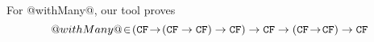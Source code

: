 For @withMany@, our tool proves
$$
@withMany@\! \in \! ({\tt CF}\! \rightarrow\! ({\tt CF} \rightarrow {\tt CF}) \rightarrow {\tt CF}) \rightarrow {\tt CF} \rightarrow ({\tt CF} \! \rightarrow \! {\tt CF}) \rightarrow {\tt CF}
$$

\begin{comment}
\subsection{A small case-study about invariants}

We consider a somewhat non-standard way of expressing propositional
logic formulae:

\begin{code}
data Formula = And [Formula]
             | Or  [Formula]
             | Neg (Formula)
             | Implies (Formula) (Formula)
             | Lit Bool
\end{code}

One invariant that we are particularily interested in is that we
should never have two consecutive negations, and that the lists of
@And@ and @Or@ are of length $\ge$ 2. We can express that as an ordinary
Haskell predicate:

\begin{code}
invariant :: Formula -> Bool
invariant f = case f of
  And xs      -> properList xs && all invariant xs
  Or xs       -> properList xs && all invariant xs
  Neg Neg{}   -> False
  Neg x       -> invariant x
  Implies x y -> invariant x && invariant y
  Lit x       -> True

properList :: [a] -> Bool
properList []  = False
properList [_] = False
properList _   = True
\end{code}

Now, we have a recursive function that negates formula:

\begin{code}
neg :: Formula -> Formula
neg (Neg f)         = f
neg (And fs)        = Or (map neg fs)
neg (Or fs)         = And (map neg fs)
neg (Implies f1 f2) = neg f2 `Implies` neg f1
neg (Lit b)         = Lit b
\end{code}

We make a combinator saying what it means to retain a predicate:

\begin{code}
retain :: (a -> Bool) -> Contract (a -> a)
retain p = Pred p :-> \x -> Pred (\r -> p x && p r)
\end{code}


\end{comment}
